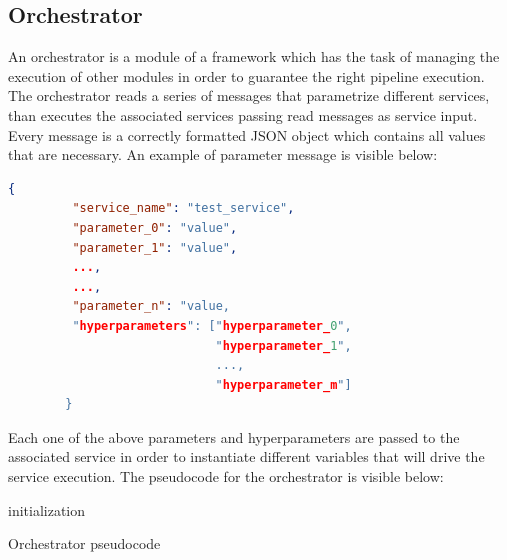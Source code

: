 \documentclass[\main/main.tex]{subfiles}
\begin{document}
\subsection{Orchestrator}
An orchestrator is a module of a framework which has the task of managing the execution of other modules in order to guarantee the right pipeline execution. The orchestrator reads a series of messages that parametrize different services, than executes the associated services passing read messages as service input. Every message is a correctly formatted JSON object which contains all values that are necessary. An example of parameter message is visible below:
\\
\begin{center}
    \begin{lstlisting}[language=json, caption="Parameter message example", captionpos=b]
        {
         "service_name": "test_service",
         "parameter_0": "value",
         "parameter_1": "value",
         ...,
         ...,
         "parameter_n": "value,
         "hyperparameters": ["hyperparameter_0", 
                             "hyperparameter_1", 
                             ..., 
                             "hyperparameter_m"]
        }
    \end{lstlisting}
\end{center}

Each one of the above parameters and hyperparameters are passed to the associated service in order to instantiate different variables that will drive the service execution.
The pseudocode for the orchestrator is visible below:
\begin{center}
    \begin{algorithm}[H]
     initialization\;
     \caption{Orchestrator pseudocode}
    \end{algorithm}
\end{center}
\end{document}

